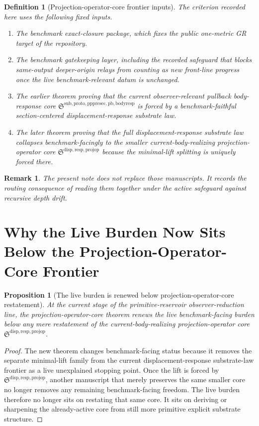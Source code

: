 \documentclass[11pt]{article}
\newcommand{\ProjectionOperatorCore}{\mathfrak S^{\mathrm{disp,resp,projop}}}
\newcommand{\PullbackBodyResponseCore}{\mathfrak S^{\mathrm{sub,proto,pppresec,pb,bodyresp}}}
\newtheorem{definition}{Definition}
\newtheorem{proposition}{Proposition}
\newtheorem{remark}{Remark}
\begin{document}
\begin{definition}[Projection-operator-core frontier inputs]
The criterion recorded here uses the following fixed inputs.
\begin{enumerate}
    \item The benchmark exact-closure package, which fixes the public one-metric GR target of the repository.
    \item The benchmark gatekeeping layer, including the recorded safeguard that blocks same-output deeper-origin relays from counting as new front-line progress once the live benchmark-relevant datum is unchanged.
    \item The earlier theorem proving that the current observer-relevant pullback body-response core \(\PullbackBodyResponseCore\) is forced by a benchmark-faithful section-centered displacement-response substrate law.
    \item The later theorem proving that the full displacement-response substrate law collapses benchmark-facingly to the smaller current-body-realizing projection-operator core \(\ProjectionOperatorCore\) because the minimal-lift splitting is uniquely forced there.
\end{enumerate}
\end{definition}

\begin{remark}
The present note does not replace those manuscripts. It records the routing consequence of reading them together under the active safeguard against recursive depth drift.
\end{remark}

\section{Why the Live Burden Now Sits Below the Projection-Operator-Core Frontier}

\begin{proposition}[The live burden is renewed below projection-operator-core restatement]
\label{prop:renewed}
At the current stage of the primitive-reservoir observer-reduction line, the projection-operator-core theorem renews the live benchmark-facing burden below any mere restatement of the current-body-realizing projection-operator core \(\ProjectionOperatorCore\).
\end{proposition}

\begin{proof}
The new theorem changes benchmark-facing status because it removes the separate minimal-lift family from the current displacement-response substrate-law frontier as a live unexplained stopping point. Once the lift is forced by \(\ProjectionOperatorCore\), another manuscript that merely preserves the same smaller core no longer removes any remaining benchmark-facing freedom. The live burden therefore no longer sits on restating that same core. It sits on deriving or sharpening the already-active core from still more primitive explicit substrate structure.
\end{proof}
\end{document}
